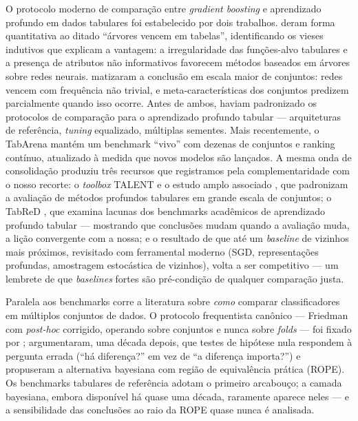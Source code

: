 O protocolo moderno de comparação
entre \emph{gradient boosting} e aprendizado profundo em dados tabulares
foi estabelecido por dois trabalhos. \citet{grinsztajn2022} deram forma
quantitativa ao ditado ``árvores vencem em tabelas'', identificando os
vieses indutivos que explicam a vantagem: a irregularidade das funções-alvo
tabulares e a presença de atributos não informativos favorecem métodos
baseados em árvores sobre redes neurais. \citet{mcelfresh2023} matizaram a
conclusão em escala maior de conjuntos: redes vencem com frequência não
trivial, e meta-características dos conjuntos predizem parcialmente quando
isso ocorre. Antes de ambos, \citet{gorishniy2021} haviam padronizado os
protocolos de comparação para o aprendizado profundo tabular ---
arquiteturas de referência, \emph{tuning} equalizado, múltiplas sementes.
Mais recentemente, o TabArena \citep{tabarena2025} mantém um benchmark ``vivo'' com dezenas
de conjuntos e ranking contínuo, atualizado à medida que novos modelos são
lançados. A mesma onda de consolidação produziu três recursos que
registramos pela complementaridade com o nosso recorte: o \emph{toolbox} TALENT \citep{talent2024} e o estudo amplo
associado \citep{ye2024closer}, que padronizam a avaliação de métodos
profundos tabulares em grande escala de conjuntos; o TabReD
\citep{tabred2024}, que examina lacunas dos benchmarks acadêmicos de
aprendizado profundo tabular --- mostrando que conclusões mudam quando
a avaliação muda, a lição convergente com a nossa; e o resultado de
que até um
\emph{baseline} de vizinhos mais próximos, revisitado com ferramental
moderno (SGD, representações profundas, amostragem estocástica de
vizinhos), volta a ser competitivo \citep{modernnca2025} --- um
lembrete de que \emph{baselines} fortes são pré-condição de qualquer
comparação justa.

Paralela aos benchmarks
corre a literatura sobre \emph{como} comparar classificadores em múltiplos
conjuntos de dados. O protocolo frequentista canônico ---
Friedman com \emph{post-hoc} corrigido, operando sobre conjuntos e nunca
sobre \emph{folds} --- foi fixado por \citet{demsar2006};
\citet{benavoli2017} argumentaram, uma década depois, que testes de
hipótese nula respondem à pergunta errada (``há diferença?'' em vez de
``a diferença importa?'') e propuseram a alternativa bayesiana com região
de equivalência prática (ROPE). Os benchmarks tabulares de referência
adotam o primeiro arcabouço; a camada bayesiana, embora disponível há
quase uma década, raramente aparece neles --- e a sensibilidade das
conclusões ao raio da ROPE quase nunca é analisada.


